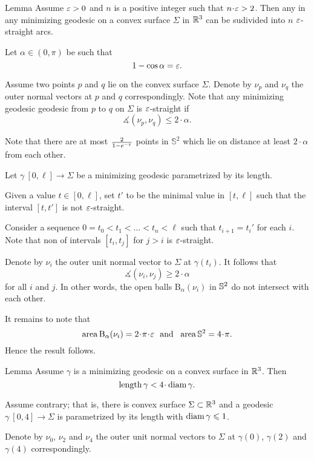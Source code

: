 \documentclass[a4paper,10pt]{amsart}
\begin{document}
\begin{thm}{Lemma}\label{lem:eps-straight}
Assume $\varepsilon>0$ 
and $n$ is a positive integer such that
$n\cdot\eps>2$.
Then any 
in any minimizing geodesic
on a convex surface $\Sigma$ in $\mathbb{R}^3$
can be sudivided into $n$   $\varepsilon$-straight arcs.
\end{thm}

Let $\alpha\in(0,\pi)$
be such that 
\[1-\cos\alpha=\varepsilon.\]

Assume two points $p$ and $q$ lie on the convex surface $\Sigma$.
Denote by $\nu_p$ and $\nu_q$ the outer normal vectors at $p$ and $q$ correspondingly.
Note that any minimizing geodesic geodesic from $p$ to $q$ on $\Sigma$
is $\varepsilon$-straight if 
\[\measuredangle(\nu_p,\nu_q)\le 2\cdot\alpha.\]

Note that there are at most $\tfrac2{1-e^{-\varepsilon}}$ points in $\mathbb S^2$ which lie on distance at least $2\cdot\alpha$ from each other.

Let $\gamma\:[0,\ell]\to \Sigma$ be a minimizing geodesic parametrized by its length.

Given a value $t\in [0,\ell]$,
set $t'$ to be the minimal value in $[t,\ell]$ such that the  interval $[t,t']$ is not $\varepsilon$-straight.

Consider a sequence $0=t_0<t_1<\dots<t_n<\ell$
such that $t_{i+1}=t_i'$ for each $i$.
Note that non of intervals $[t_i,t_j]$
for $j>i$ is $\varepsilon$-straight.

Denote by $\nu_i$ the outer unit normal vector to $\Sigma$ at $\gamma(t_i)$. 
It follows that 
\[\measuredangle(\nu_i,\nu_j)\ge2\cdot\alpha\] for all $i$ and $j$.
In other words, the open balls $\mathrm{B}_\alpha(\nu_i)$
in $\mathbb{S}^2$ do not intersect with each other.

It remains to note that 
\[\area\mathrm{B}_\alpha(\nu_i) =2\cdot\pi\cdot\eps
 \ \ \text{and}\ \ 
 \area\SS^2=4\cdot\pi.
\]
Hence the result follows.
\qeds


\begin{thm}{Lemma}\label{lem:diam-length}
Assume $\gamma$ is a minimizing geodesic on a convex surface in $\mathbb{R}^3$.
Then 
\[\length\gamma< 4\cdot\diam \gamma.\]
\end{thm}

Assume contrary;
that is, 
there is convex surface $\Sigma\subset\mathbb{R}^3$
and a geodesic $\gamma\:[0,4]\to \Sigma$ 
is parametrized by its length with $\operatorname{diam} \gamma\leqslant 1$.

Denote by $\nu_0$, $\nu_2$ and $\nu_4$ the outer unit normal vectors
to $\Sigma$ at $\gamma(0)$, $\gamma(2)$ and $\gamma(4)$ correspondingly.
\end{document}
